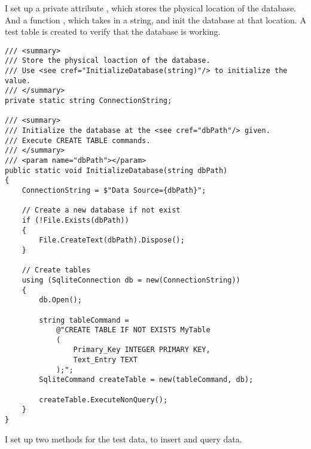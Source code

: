 \documentclass[report.tex]{subfiles}
\begin{document}
I set up a private attribute , which stores the physical location of the database. And a function , which takes in a string, and init the database at that location. A test table is created to verify that the database is working.

\begin{verbatim}
/// <summary>
/// Store the physical loaction of the database.
/// Use <see cref="InitializeDatabase(string)"/> to initialize the value.
/// </summary>
private static string ConnectionString;

/// <summary>
/// Initialize the database at the <see cref="dbPath"/> given.
/// Execute CREATE TABLE commands.
/// </summary>
/// <param name="dbPath"></param>
public static void InitializeDatabase(string dbPath)
{
    ConnectionString = $"Data Source={dbPath}";

    // Create a new database if not exist
    if (!File.Exists(dbPath))
    {
        File.CreateText(dbPath).Dispose();
    }

    // Create tables
    using (SqliteConnection db = new(ConnectionString))
    {
        db.Open();

        string tableCommand =
            @"CREATE TABLE IF NOT EXISTS MyTable 
            (
                Primary_Key INTEGER PRIMARY KEY,
                Text_Entry TEXT
            );";
        SqliteCommand createTable = new(tableCommand, db);

        createTable.ExecuteNonQuery();
    }
}
\end{verbatim}

I set up two methods for the test data, to insert and query data.
\end{document}
